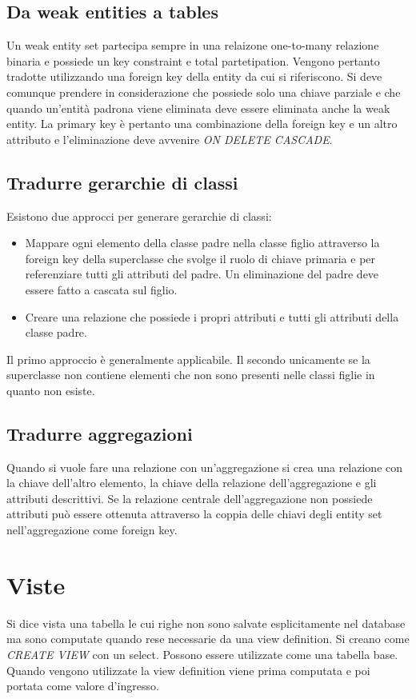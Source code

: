 \subsection{Da weak entities a tables}
Un weak entity set partecipa sempre in una relaizone one-to-many relazione binaria e possiede un key constraint e total partetipation. Vengono pertanto tradotte utilizzando una foreign key della entity da cui
si riferiscono. Si deve comunque prendere in considerazione che possiede solo una chiave parziale e che quando un'entit\`a padrona viene eliminata deve essere eliminata anche la weak entity. La primary
key \`e pertanto una combinazione della foreign key e un altro attributo e l'eliminazione deve avvenire \emph{ON DELETE CASCADE}.
\subsection{Tradurre gerarchie di classi}
Esistono due approcci per generare gerarchie di classi: 
\begin{itemize}
\item Mappare ogni elemento della classe padre nella classe figlio attraverso la foreign key della superclasse che svolge il ruolo di chiave primaria e per referenziare tutti gli attributi del padre. Un eliminazione
del padre deve essere fatto a cascata sul figlio.
\item Creare una relazione che possiede i propri attributi e tutti gli attributi della classe padre.
\end{itemize}
Il primo approccio \`e generalmente applicabile. Il secondo unicamente se la superclasse non contiene elementi che non sono presenti nelle classi figlie in quanto non esiste.
\subsection{Tradurre aggregazioni}
Quando si vuole fare una relazione con un'aggregazione si crea una relazione con la chiave dell'altro elemento, la chiave della relazione dell'aggregazione e gli attributi descrittivi. Se la relazione centrale 
dell'aggregazione non possiede attributi pu\`o essere ottenuta attraverso la coppia delle chiavi degli entity set nell'aggregazione come foreign key. 
\section{Viste}
Si dice vista una tabella le cui righe non sono salvate esplicitamente nel database ma sono computate quando rese necessarie da una view definition. Si creano come \emph{CREATE VIEW} con un select.
Possono essere utilizzate come una tabella base. Quando vengono utilizzate la view definition viene prima computata e poi portata come valore d'ingresso.
